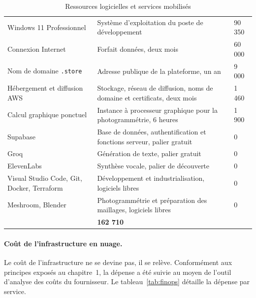\begin{table}[htbp]
\centering
\caption{Ressources logicielles et services mobilisés}
\label{tab:logiciel}
\small
\begin{tabularx}{\textwidth}{|L{4.4cm}|X|R{2.4cm}|}
\hline
{}
 &  &  \\ \hline
Windows 11 Professionnel & Système d'exploitation du poste de développement & 90 350 \\ \hline
Connexion Internet & Forfait données, deux mois & 60 000 \\ \hline
Nom de domaine \texttt{.store} & Adresse publique de la plateforme, un an & 9 000 \\ \hline
Hébergement et diffusion AWS & Stockage, réseau de diffusion, noms de domaine et certificats, deux mois & 1 460 \\ \hline
Calcul graphique ponctuel & Instance à processeur graphique pour la photogrammétrie, 6 heures & 1 900 \\ \hline
Supabase & Base de données, authentification et fonctions serveur, palier gratuit & 0 \\ \hline
Groq & Génération de texte, palier gratuit & 0 \\ \hline
ElevenLabs & Synthèse vocale, palier de découverte & 0 \\ \hline
Visual Studio Code, Git, Docker, Terraform & Développement et industrialisation, logiciels libres & 0 \\ \hline
Meshroom, Blender & Photogrammétrie et préparation des maillages, logiciels libres & 0 \\ \hline
{}
 & \textbf{162 710} \\ \hline
\end{tabularx}
\end{table}

\paragraph{Coût de l'infrastructure en nuage.}

Le coût de l'infrastructure ne se devine pas, il se relève. Conformément aux
principes exposés au chapitre~1, la dépense a été suivie au moyen de l'outil
d'analyse des coûts du fournisseur. Le tableau~\ref{tab:finops} détaille la
dépense par service.

